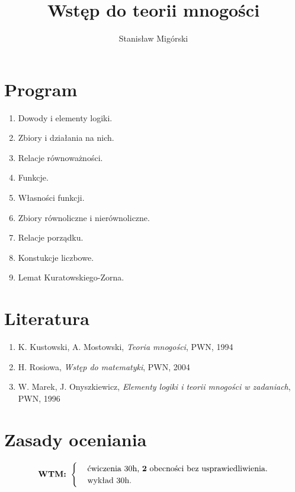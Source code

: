 \documentclass[a5paper,8pt]{article}
\title{Wstęp do teorii mnogości}
\author{Stanisław Migórski}
\date{}
\begin{document}
    \maketitle
    \tableofcontents
    \pagebreak

    \section{Program} %
    \label{sec:program}
        \begin{enumerate}
            \item Dowody i elementy logiki.
            \item Zbiory i działania na nich.
            \item Relacje równoważności.
            \item Funkcje.
            \item Własności funkcji.
            \item Zbiory równoliczne i nierównoliczne.
            \item Relacje porządku.
            \item Konstukcje liczbowe.
            \item Lemat Kuratowskiego-Zorna.
        \end{enumerate}

    \section{Literatura} %
    \label{sec:literatura}
        \begin{enumerate}
            \item K. Kustowski, A. Mostowski, \textit{Teoria mnogości}, PWN, 1994
            \item H. Rosiowa, \textit{Wstęp do matematyki}, PWN, 2004
            \item W. Marek, J. Onyszkiewicz, \textit{Elementy logiki i teorii mnogości w zadaniach}, PWN, 1996
        \end{enumerate}

    \section{Zasady oceniania} %
    \label{sec:zasady_oceniania}

        \begin{equation*}
          \textbf{WTM:  }\begin{cases}
            & \text{ćwiczenia 30h, \textbf{2} obecności bez usprawiedliwienia}.\\
            & \text{wykład 30h}.
          \end{cases}
        \end{equation*}
\end{document}
